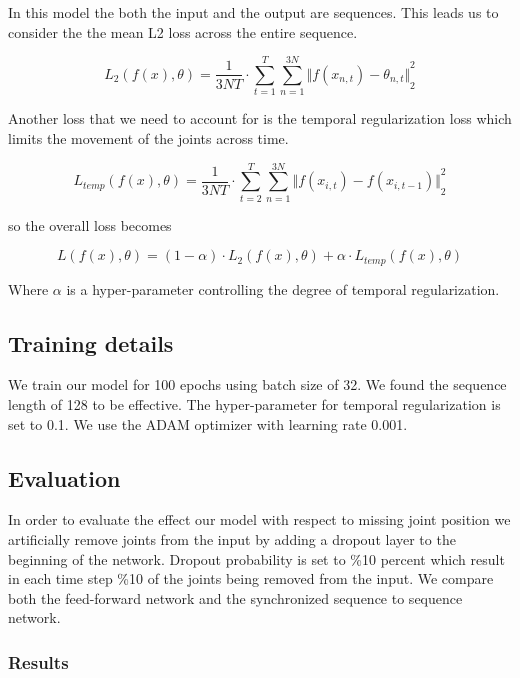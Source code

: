 In this model the both the input and the output are sequences. This leads us to consider the the mean L2 loss across the entire sequence.

\begin{equation}	
    L_2(f(x),\theta) = \frac{1}{3NT} \cdot \sum_{t=1}^{T} \sum_{n=1}^{3N} {\Vert f(x_{n,t})-\theta_{n,t} \Vert}_2^2
\end{equation}

Another loss that we need to account for is the temporal regularization loss which limits the movement of the joints across time.

\begin{equation}	
    L_{temp}(f(x),\theta) = \frac{1}{3NT} \cdot \sum_{t=2}^{T} \sum_{n=1}^{3N} {\Vert f(x_{i,t})-f(x_{i,t-1}) \Vert}_2^2
\end{equation}

so the overall loss becomes 

\begin{equation}	
    L(f(x),\theta) = (1-\alpha) \cdot L_2(f(x),\theta) + \alpha \cdot L_{temp}(f(x),\theta)
\end{equation}

Where $\alpha$ is a hyper-parameter controlling the degree of temporal regularization.

\subsection{Training details}

We train our model for 100 epochs using batch size of 32. We found the sequence length of 128 to be effective. The hyper-parameter for temporal regularization is set to 0.1. We use the ADAM optimizer with learning rate 0.001. 

\subsection{Evaluation}

In order to evaluate the effect our model with respect to missing joint position we artificially remove joints from the input by adding a dropout layer to the beginning of the network. Dropout probability is set to \%10 percent which result in each time step \%10 of the joints being removed from the input. We compare both the feed-forward network and the synchronized sequence to sequence network.

\subsubsection{Results}

